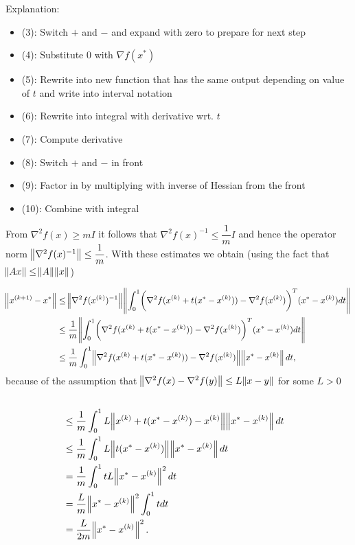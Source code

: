 \documentclass[12pt,a4paper]{article}
\begin{document}
Explanation:
\begin{itemize}
    \item (3): Switch $+$ and $-$ and expand with zero to prepare for next step
    \item (4): Substitute 0 with $\nabla f(x^*)$
    \item (5): Rewrite into new function that has the same output depending on value of $t$ and write into interval notation
    \item (6): Rewrite into integral with derivative wrt. $t$
    \item (7): Compute derivative
    \item (8): Switch $+$ and $-$ in front
    \item (9): Factor in by multiplying with inverse of Hessian from the front
    \item (10): Combine with integral
\end{itemize}

From $\nabla^2 f(x) \geq mI$ it follows that $\nabla^2 f(x)^{-1} \leq \dfrac{1}{m}I$ and hence the operator norm $\norm{\nabla^2 f(x)^{-1}} \leq \dfrac{1}{m}$. With these estimates we obtain (using the fact that $\norm{Ax}\leq \norm{A}\norm{x}$)

\begin{equation*}\begin{aligned}
    \norm{\kth[k+1]{x}-x^{*}} &\leq \norm{\nabla^2 f(\kth{x})^{-1}} \norm{\int_{0}^{1} \biggl(\nabla^2 f(\kth{x} + t(x^{*}-\kth{x})) - \nabla^2 f(\kth{x})\biggr)^T(x^{*} - \kth{x})dt}
    \\ &\leq \dfrac{1}{m} \norm{\int_{0}^{1} \biggl(\nabla^2 f(\kth{x} + t(x^{*}-\kth{x})) - \nabla^2 f(\kth{x})\biggr)^T(x^{*} - \kth{x})dt}
    \\ &\leq \dfrac{1}{m} \int_{0}^{1} \norm{\nabla^2 f(\kth{x} + t(x^{*}-\kth{x})) - \nabla^2 f(\kth{x})}\norm{x^{*} - \kth{x}}dt,
\end{aligned}\end{equation*}
    because of the assumption that $\norm{\nabla^2 f(x) - \nabla^2 f(y)} \leq L\norm{x -y } $ for some $L > 0$
\begin{align*}
    \\ &\leq \dfrac{1}{m}  \int_{0}^{1} L\norm{\kth{x} + t(x^{*}-\kth{x}) - \kth{x}} \norm{x^{*}-\kth{x}}dt
    \\ &\leq \dfrac{1}{m}  \int_{0}^{1} L\norm{ t(x^{*}-\kth{x})} \norm{x^{*}-\kth{x}}dt
    \\ &= \dfrac{1}{m}  \int_{0}^{1} t L \norm{x^{*}-\kth{x}}^2dt
    \\ &= \dfrac{L}{m} \norm{x^{*}-\kth{x}}^2  \int_{0}^{1} t dt
    \\ &=  \dfrac{L}{2m}  \norm{x^{*}-\kth{x}}^2.
\end{align*}
\end{document}
